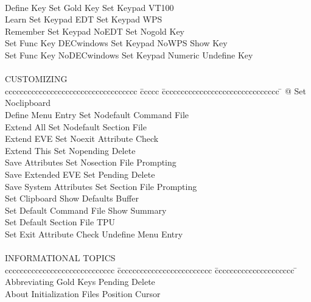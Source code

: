 \begin{tabbing}
 \\
    Define Key                \> Set Gold Key       \> Set Keypad VT100    \\
    Learn                     \> Set Keypad EDT     \> Set Keypad WPS      \\
    Remember                  \> Set Keypad NoEDT   \> Set Nogold Key      \\
    Set Func Key DECwindows   \> Set Keypad NoWPS   \> Show Key            \\
    Set Func Key NoDECwindows \> Set Keypad Numeric \> Undefine Key        \\
 \\
 CUSTOMIZING \\
ccccccccccccccccccccccccccccccccccc \= ccccc \= ccccccccccccccccccccccccccccccc \= \kill
    @                         \> \>   Set Noclipboard                     \\
    Define Menu Entry         \> \>   Set Nodefault Command File          \\
    Extend All                \> \>   Set Nodefault Section File          \\
    Extend EVE                \> \>   Set Noexit Attribute Check          \\
    Extend This               \> \>   Set Nopending Delete                \\
    Save Attributes           \> \>   Set Nosection File Prompting        \\
    Save Extended EVE         \> \>   Set Pending Delete                  \\
    Save System Attributes    \> \>   Set Section File Prompting          \\
    Set Clipboard             \> \>   Show Defaults Buffer                \\
    Set Default Command File  \> \>   Show Summary                        \\
    Set Default Section File  \> \>   TPU                                 \\
    Set Exit Attribute Check  \> \>   Undefine Menu Entry                 \\
 \\
 INFORMATIONAL TOPICS \\
ccccccccccccccccccccccccccccc \= ccccccccccccccccccccccccc \= ccccccccccccccccccccc \= \kill
 \\
    Abbreviating         \>  Gold Keys            \> Pending Delete        \\
    About                \>  Initialization Files \> Position Cursor       \\

\end{tabbing}
